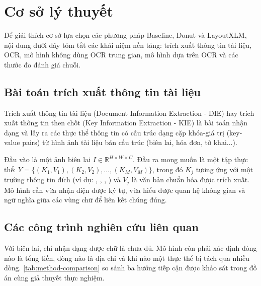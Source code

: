 \section{Cơ sở lý thuyết}
\label{sec:theory}

Để giải thích cơ sở lựa chọn các phương pháp Baseline, Donut và LayoutXLM, nội dung dưới đây tóm tắt các khái niệm nền tảng: trích xuất thông tin tài liệu, OCR, mô hình không dùng OCR trung gian, mô hình dựa trên OCR và các thước đo đánh giá chuỗi.

\subsection{Bài toán trích xuất thông tin tài liệu}
\label{subsec:kie_problem}

Trích xuất thông tin tài liệu (Document Information Extraction - DIE) hay trích xuất thông tin then chốt (Key Information Extraction - KIE) là bài toán nhận dạng và lấy ra các thực thể thông tin có cấu trúc dạng cặp khóa-giá trị (key-value pairs) từ hình ảnh tài liệu bán cấu trúc (biên lai, hóa đơn, tờ khai...).

Đầu vào là một ảnh biên lai $I \in \mathbb{R}^{H \times W \times C}$. Đầu ra mong muốn là một tập thực thể: $Y = \{(K_1, V_1), (K_2, V_2), \dots, (K_M, V_M)\}$, trong đó $K_j$ tương ứng với một trường thông tin đích (ví dụ: , , , ) và $V_j$ là văn bản chuẩn hóa được trích xuất. Mô hình cần vừa nhận diện được ký tự, vừa hiểu được quan hệ không gian và ngữ nghĩa giữa các vùng chữ để liên kết chúng đúng.

\subsection{Các công trình nghiên cứu liên quan}
\label{subsec:related_work}

Với biên lai, chỉ nhận dạng được chữ là chưa đủ. Mô hình còn phải xác định dòng nào là tổng tiền, dòng nào là địa chỉ và khi nào một thực thể bị tách qua nhiều dòng. \cref{tab:method-comparison} so sánh ba hướng tiếp cận được khảo sát trong đồ án cùng giả thuyết thực nghiệm.

